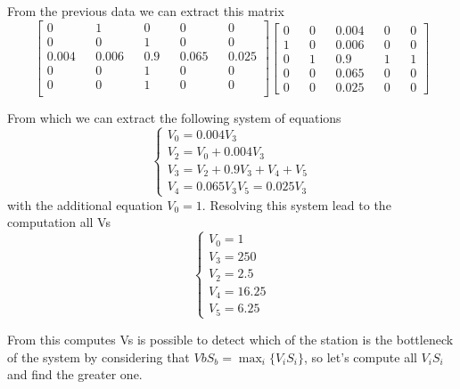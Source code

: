 \documentclass[12pt,a4paper]{article}
\begin{document}
    From the previous data we can extract this matrix 
    \begin{displaymath}
        \begin{bmatrix}
            0 && 1 && 0 && 0 && 0 \\
            0 && 0 && 1 && 0 && 0 \\
            0.004 && 0.006 && 0.9 && 0.065 && 0.025 \\
            0 && 0 && 1 && 0 && 0 \\
            0 && 0 && 1 && 0 && 0 \\
        \end{bmatrix}
        \begin{bmatrix}
            0 && 0 && 0.004 && 0 && 0 \\
            1 && 0 && 0.006 && 0 && 0 \\
            0 && 1 && 0.9 && 1 && 1 \\
            0 && 0 && 0.065 && 0 && 0\\
            0 && 0 && 0.025 && 0 && 0
        \end{bmatrix}
    \end{displaymath}

    From which we can extract the following system of equations 
    \begin{displaymath}
        \begin{cases}
            V_0=0.004V_3\\
            V_2=V_0+0.004V_3\\
            V_3=V_2+0.9V_3+V_4+V_5\\
            V_4=0.065V_3
            V_5= 0.025V_3
        \end{cases}
    \end{displaymath}
    with the additional equation $V_0=1$. Resolving this system lead to the computation 
    all Vs 
    \begin{displaymath}
        \begin{cases}
            V_0=1 \\
            V_3=250\\
            V_2=2.5\\
            V_4=16.25\\
            V_5=6.25
        \end{cases}
    \end{displaymath}

    From this computes Vs is possible to detect which of the station is the bottleneck of the system
    by considering that $VbS_b= \max_i\{V_iS_i\}$, so let's compute all $V_iS_i$ and find 
    the greater one. 
\end{document}
